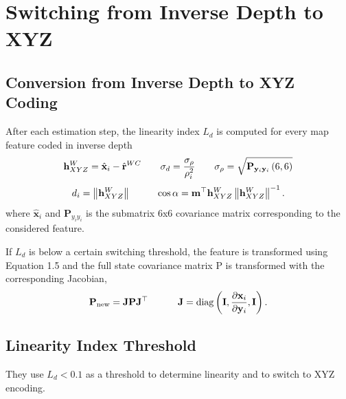 \documentclass[twoside]{article}
\begin{document}
\section{Switching from Inverse Depth to XYZ}

\subsection*{Conversion from Inverse Depth to XYZ Coding}
After each estimation step, the linearity index $L_d$ is computed for every map feature coded in inverse depth
\begin{equation}
{\bf h}^W_{{{{XYZ}}}} =\hat{{\bf x}}_i-\hat{{\bf r}}^{WC}\qquad \sigma_d = {\sigma_\rho \over \rho_i^2}\qquad \sigma_\rho=\sqrt{{\bf P}_{{\bf y}_i{\bf y}_i}\left(6,6\right)} 
\end{equation}
\begin{equation}
d_i = \left\Vert {\bf h}^W_{{XYZ}}\right\Vert \qquad\;\;\;\cos\alpha = {\bf m}^\top{\bf h}^W_{{XYZ}} \left\Vert {\bf h}^W_{{XYZ}}\right\Vert ^{-1}.
\end{equation}
where $\hat{\textbf{x}}_i$ and $\textbf{P}_{y_i y_i}$ is the submatrix 6x6 covariance matrix corresponding to the considered feature.

If $L_d$ is below a certain switching threshold, the feature is transformed using Equation 1.5 and the full state covariance matrix P is transformed with the corresponding Jacobian,
\begin{equation}
{\bf P}_{{\rm new}}={\bf J}{\bf P}{\bf J}^\top \qquad\;\;\;\; {\bf J}={\rm diag}\left({\bf I},{\partial {\bf x}_i \over \partial {\bf y}_i},{\bf I}\right) .
\end{equation}

\subsection*{Linearity Index Threshold}
They use $L_d < 0.1$ as a threshold to determine linearity and to switch to XYZ encoding.
\end{document}
